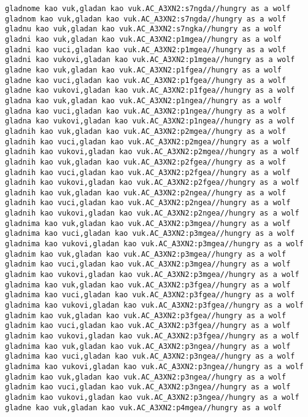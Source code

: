 \begin{verbatim}
gladnome kao vuk,gladan kao vuk.AC_A3XN2:s7ngda//hungry as a wolf
gladnom kao vuk,gladan kao vuk.AC_A3XN2:s7ngda//hungry as a wolf
gladnu kao vuk,gladan kao vuk.AC_A3XN2:s7ngka//hungry as a wolf
gladni kao vuk,gladan kao vuk.AC_A3XN2:p1mgea//hungry as a wolf
gladni kao vuci,gladan kao vuk.AC_A3XN2:p1mgea//hungry as a wolf
gladni kao vukovi,gladan kao vuk.AC_A3XN2:p1mgea//hungry as a wolf
gladne kao vuk,gladan kao vuk.AC_A3XN2:p1fgea//hungry as a wolf
gladne kao vuci,gladan kao vuk.AC_A3XN2:p1fgea//hungry as a wolf
gladne kao vukovi,gladan kao vuk.AC_A3XN2:p1fgea//hungry as a wolf
gladna kao vuk,gladan kao vuk.AC_A3XN2:p1ngea//hungry as a wolf
gladna kao vuci,gladan kao vuk.AC_A3XN2:p1ngea//hungry as a wolf
gladna kao vukovi,gladan kao vuk.AC_A3XN2:p1ngea//hungry as a wolf
gladnih kao vuk,gladan kao vuk.AC_A3XN2:p2mgea//hungry as a wolf
gladnih kao vuci,gladan kao vuk.AC_A3XN2:p2mgea//hungry as a wolf
gladnih kao vukovi,gladan kao vuk.AC_A3XN2:p2mgea//hungry as a wolf
gladnih kao vuk,gladan kao vuk.AC_A3XN2:p2fgea//hungry as a wolf
gladnih kao vuci,gladan kao vuk.AC_A3XN2:p2fgea//hungry as a wolf
gladnih kao vukovi,gladan kao vuk.AC_A3XN2:p2fgea//hungry as a wolf
gladnih kao vuk,gladan kao vuk.AC_A3XN2:p2ngea//hungry as a wolf
gladnih kao vuci,gladan kao vuk.AC_A3XN2:p2ngea//hungry as a wolf
gladnih kao vukovi,gladan kao vuk.AC_A3XN2:p2ngea//hungry as a wolf
gladnima kao vuk,gladan kao vuk.AC_A3XN2:p3mgea//hungry as a wolf
gladnima kao vuci,gladan kao vuk.AC_A3XN2:p3mgea//hungry as a wolf
gladnima kao vukovi,gladan kao vuk.AC_A3XN2:p3mgea//hungry as a wolf
gladnim kao vuk,gladan kao vuk.AC_A3XN2:p3mgea//hungry as a wolf
gladnim kao vuci,gladan kao vuk.AC_A3XN2:p3mgea//hungry as a wolf
gladnim kao vukovi,gladan kao vuk.AC_A3XN2:p3mgea//hungry as a wolf
gladnima kao vuk,gladan kao vuk.AC_A3XN2:p3fgea//hungry as a wolf
gladnima kao vuci,gladan kao vuk.AC_A3XN2:p3fgea//hungry as a wolf
gladnima kao vukovi,gladan kao vuk.AC_A3XN2:p3fgea//hungry as a wolf
gladnim kao vuk,gladan kao vuk.AC_A3XN2:p3fgea//hungry as a wolf
gladnim kao vuci,gladan kao vuk.AC_A3XN2:p3fgea//hungry as a wolf
gladnim kao vukovi,gladan kao vuk.AC_A3XN2:p3fgea//hungry as a wolf
gladnima kao vuk,gladan kao vuk.AC_A3XN2:p3ngea//hungry as a wolf 
gladnima kao vuci,gladan kao vuk.AC_A3XN2:p3ngea//hungry as a wolf
gladnima kao vukovi,gladan kao vuk.AC_A3XN2:p3ngea//hungry as a wolf
gladnim kao vuk,gladan kao vuk.AC_A3XN2:p3ngea//hungry as a wolf
gladnim kao vuci,gladan kao vuk.AC_A3XN2:p3ngea//hungry as a wolf
gladnim kao vukovi,gladan kao vuk.AC_A3XN2:p3ngea//hungry as a wolf
gladne kao vuk,gladan kao vuk.AC_A3XN2:p4mgea//hungry as a wolf

\end{verbatim}
